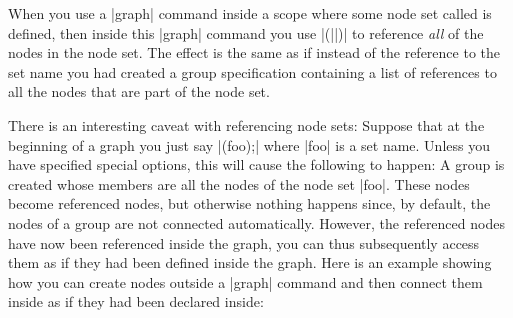 When you use a |graph| command inside a scope where some node set called
 is defined, then inside this |graph| command you use
|(||)| to reference \emph{all} of the nodes in the node set. The
effect is the same as if instead of the reference to the set name you had
created a group specification containing a list of references to all the nodes
that are part of the node set.
%
\begin{codeexample}[preamble={\usetikzlibrary{graphs}}]
\end{codeexample}

There is an interesting caveat with referencing node sets: Suppose that at the
beginning of a graph you just say |(foo);| where |foo| is a set name. Unless
you have specified special options, this will cause the following to happen: A
group is created whose members are all the nodes of the node set |foo|. These
nodes become referenced nodes, but otherwise nothing happens since, by default,
the nodes of a group are not connected automatically. However, the referenced
nodes have now been referenced inside the graph, you can thus subsequently
access them as if they had been defined inside the graph. Here is an example
showing how you can create nodes outside a |graph| command and then connect
them inside as if they had been declared inside:
%
\begin{codeexample}[preamble={\usetikzlibrary{graphs}}]
\end{codeexample}

